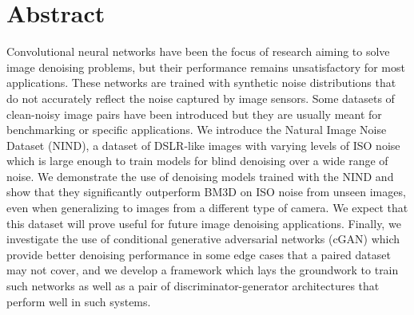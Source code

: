 \begingroup
\let\clearpage\relax
\let\cleardoublepage\relax
\let\cleardoublepage\relax

\chapter*{Abstract}


Convolutional neural networks have been the focus of research aiming to solve image denoising problems, but their performance remains unsatisfactory for most applications. These networks are trained with synthetic noise distributions that do not accurately reflect the noise captured by image sensors. Some datasets of clean-noisy image pairs have been introduced but they are usually meant for benchmarking or specific applications. We introduce the Natural Image Noise Dataset (NIND), a dataset of DSLR-like images with varying levels of ISO noise which is large enough to train models for blind denoising over a wide range of noise. We demonstrate the use of denoising models trained with the NIND and show that they significantly outperform BM3D on ISO noise from unseen images, even when generalizing to images from a different type of camera. We expect that this dataset will prove useful for future image denoising applications. Finally, we investigate the use of conditional generative adversarial networks (cGAN) which provide better denoising performance in some edge cases that a paired dataset may not cover, and we develop a framework which lays the groundwork to train such networks as well as a pair of discriminator-generator architectures that perform well in such systems.


\vfill


\endgroup

\vfill
